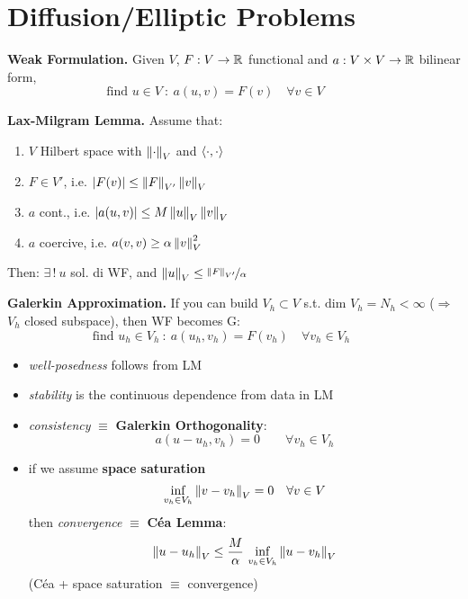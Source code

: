 

\section{Diffusion/Elliptic Problems}


\textbf{Weak Formulation.} Given $V$, $F:V\to\mathbb{R}$ functional and $a:V\times V\to\mathbb{R}$ bilinear form,
\begin{equation*}
\boxed{\text{find } u\in V\ :\ a(u,v)=F(v)\quad\forall v\in V}\qquad\quad
\end{equation*}

\smallskip

\textbf{Lax-Milgram Lemma.} Assume that:
\begin{enumerate}
\item $V$ Hilbert space with $\left\lVert \cdot \right\rVert_V$ and $\left\langle \cdot,\cdot \right\rangle$
\item $F\in V'$, i.e. $\left\lvert F(v) \right\rvert\leq \left\lVert F \right\rVert_{V'}\left\lVert v \right\rVert_V$
\item $a$ cont., i.e. $\left\lvert a(u,v) \right\rvert\leq M \left\lVert u \right\rVert_V\left\lVert v \right\rVert_V$
\item $a$ coercive, i.e. $a(v,v)\geq \alpha \left\lVert v \right\rVert_V^2$
\end{enumerate}
Then: $\exists\,!\ u$ sol. di WF, and $\left\lVert u \right\rVert_V\leq \nicefrac{\left\lVert F \right\rVert_{V'}}{\alpha}$

\medskip

\textbf{Galerkin Approximation.} If you can build $V_h\subset V$ s.t. $\text{dim }V_h=N_h<\infty$ ($\Rightarrow$ $V_h$ closed subspace), then WF becomes G:
\begin{equation*}
\boxed{\text{find } u_h\in V_h\ :\ a(u_h,v_h)=F(v_h)\quad\forall v_h\in V_h}\qquad
\end{equation*}

\begin{itemize}
\item \emph{well-posedness} follows from LM
\item \emph{stability} is the continuous dependence from data in LM
\item \emph{consistency} $\equiv$ \textbf{Galerkin Orthogonality}:
\begin{equation*}
a(u-u_h,v_h)=0\qquad\forall v_h\in V_h
\end{equation*}
\item if we assume \textbf{space saturation}
\begin{equation*}
\inf_{v_h\in V_h}\left\lVert v-v_h \right\rVert_V=0\quad\forall v\in V
\end{equation*}
then \emph{convergence} $\equiv$ \textbf{Céa Lemma}:
\begin{equation*}
\left\lVert u-u_h \right\rVert_V\leq \frac{M}{\alpha}\,\inf_{v_h\in V_h}\left\lVert u-v_h \right\rVert_V
\end{equation*}
(Céa + space saturation $\equiv$ convergence)
\end{itemize}

